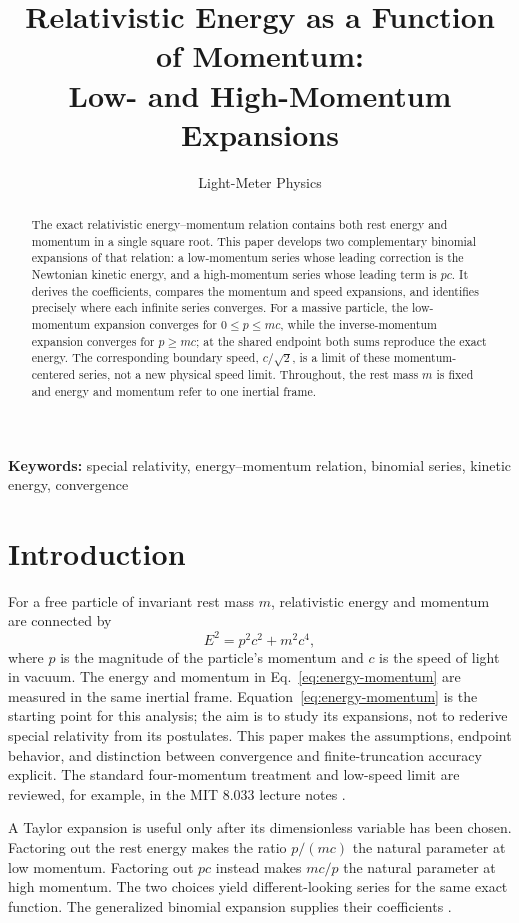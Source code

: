\documentclass[12pt]{article}
\title{Relativistic Energy as a Function of Momentum:\\
Low- and High-Momentum Expansions}
\author{Light-Meter Physics}
\date{}
\begin{document}
\maketitle

\begin{abstract}
The exact relativistic energy--momentum relation contains both rest energy and momentum in a single square root. This paper develops two complementary binomial expansions of that relation: a low-momentum series whose leading correction is the Newtonian kinetic energy, and a high-momentum series whose leading term is $pc$. It derives the coefficients, compares the momentum and speed expansions, and identifies precisely where each infinite series converges. For a massive particle, the low-momentum expansion converges for $0\leq p\leq mc$, while the inverse-momentum expansion converges for $p\geq mc$; at the shared endpoint both sums reproduce the exact energy. The corresponding boundary speed, $c/\sqrt{2}$, is a limit of these momentum-centered series, not a new physical speed limit. Throughout, the rest mass $m$ is fixed and energy and momentum refer to one inertial frame.
\end{abstract}

\noindent\textbf{Keywords:} special relativity, energy--momentum relation, binomial series, kinetic energy, convergence

\section{Introduction}

For a free particle of invariant rest mass $m$, relativistic energy and momentum are connected by
\begin{equation}
  E^2=p^2c^2+m^2c^4,
  \label{eq:energy-momentum}
\end{equation}
where $p$ is the magnitude of the particle's momentum and $c$ is the speed of light in vacuum. The energy and momentum in Eq.~\eqref{eq:energy-momentum} are measured in the same inertial frame. Equation~\eqref{eq:energy-momentum} is the starting point for this analysis; the aim is to study its expansions, not to rederive special relativity from its postulates. This paper makes the assumptions, endpoint behavior, and distinction between convergence and finite-truncation accuracy explicit. The standard four-momentum treatment and low-speed limit are reviewed, for example, in the MIT 8.033 lecture notes \cite{Hughes2024}.

A Taylor expansion is useful only after its dimensionless variable has been chosen. Factoring out the rest energy makes the ratio $p/(mc)$ the natural parameter at low momentum. Factoring out $pc$ instead makes $mc/p$ the natural parameter at high momentum. The two choices yield different-looking series for the same exact function. The generalized binomial expansion supplies their coefficients \cite{DLMF}.
\end{document}
